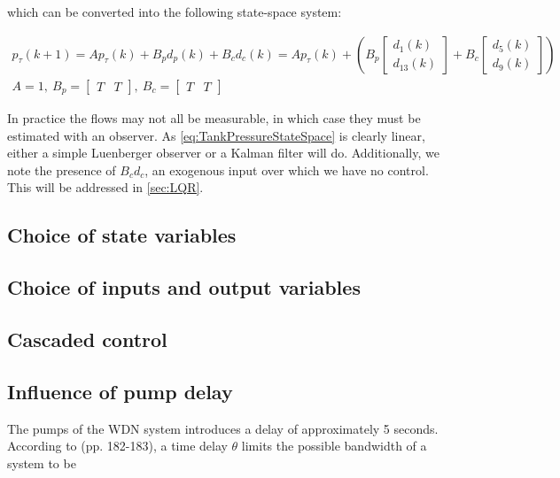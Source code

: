 which can be converted into the following state-space system:

\begin{equation}\label{eq:TankPressureStateSpace}
	\begin{gathered}
				p_\tau(k+1) = A p_\tau(k) + B_pd_p(k) + B_cd_c(k)
				= A p_\tau(k) + \left(B_p \begin{bmatrix}d_1(k) \\ d_{13}(k)\end{bmatrix} 
				+ B_c\begin{bmatrix}d_5(k) \\ d_9(k)\end{bmatrix}\right) \\      
				A = 1, \ B_p = \begin{bmatrix}T & T \end{bmatrix}, \ B_c = \begin{bmatrix}T & T\end{bmatrix}
	\end{gathered}
\end{equation}

In practice the flows may not all be measurable, in which case they must be estimated with an observer. As \cref{eq:TankPressureStateSpace} is clearly linear, either a simple Luenberger observer or a Kalman filter will do. Additionally, we note the presence of $B_cd_c$, an exogenous input over which we have no control. This will be addressed in \cref{sec:LQR}.


\subsection{Choice of state variables}

\subsection{Choice of inputs and output variables}

\subsection{Cascaded control}

\subsection{Influence of pump delay}
The pumps of the WDN system introduces a delay of approximately 5 seconds. According to \cite{Skogestad2005} (pp. 182-183), 
a time delay $\theta$ limits the possible bandwidth of a system to be 

